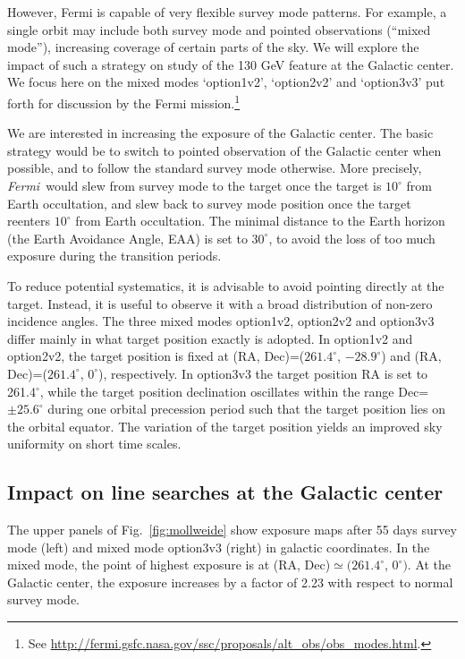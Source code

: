 \documentclass[aps,prd,superscriptaddress,nofootinbib,fixlfloat, 12pt]{revtex4-1}
\newcommand{\Fermi}{{\slshape Fermi}}
\begin{document}
However, Fermi is capable of very flexible survey mode patterns. For example,
a single orbit may include both survey mode and pointed observations (``mixed
mode''), increasing coverage of certain parts of the sky. We will explore the
impact of such a strategy on study of the 130 GeV feature at the Galactic
center.  We focus here on the mixed modes `option1v2', `option2v2' and
`option3v3' put forth for discussion by the Fermi mission.\footnote{See
\url{http://fermi.gsfc.nasa.gov/ssc/proposals/alt_obs/obs_modes.html}.}

We are interested in increasing the exposure of the Galactic center.  The
basic strategy would be to switch to pointed observation of the Galactic
center when possible, and to follow the standard survey mode otherwise. More
precisely, \Fermi\ would slew from survey mode to the target once the target
is $10^\circ$ from Earth occultation, and slew back to survey mode position
once the target reenters $10^\circ$ from Earth occultation.  The minimal
distance to the Earth horizon (the Earth Avoidance Angle, EAA) is set to
$30^\circ$, to avoid the loss of too much exposure during the transition
periods. 

To reduce potential systematics, it is advisable to avoid pointing directly at
the target. Instead, it is useful to observe it with a broad distribution of
non-zero incidence angles. The three mixed modes option1v2, option2v2
and option3v3 differ mainly in what target position exactly is adopted.
In option1v2 and option2v2, the target position is fixed at (RA,
Dec)=($261.4^\circ$, $-28.9^\circ$) and (RA, Dec)=($261.4^\circ$, $0^\circ$),
respectively.  In option3v3 the target position RA is set to
261.4$^\circ$, while the target position declination oscillates within the
range Dec=$\pm25.6^\circ$ during one orbital precession period such that the
target position lies on the orbital equator.  The variation of the target
position yields an improved sky uniformity on short time scales. 

\subsection{Impact on line searches at the Galactic center}
The upper panels of Fig.~\ref{fig:mollweide} show exposure maps after 55 days
survey mode (left) and mixed mode option3v3 (right) in galactic
coordinates.  In the mixed mode, the point of highest exposure is at (RA,
Dec)$\simeq(261.4^\circ$, $0^\circ)$. At the Galactic center, the exposure increases by a
factor of 2.23 with respect to normal survey mode.
\end{document}

